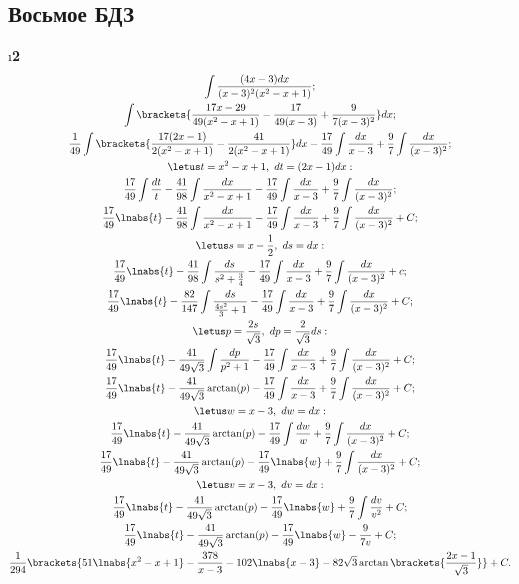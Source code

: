 \subsection{Восьмое БДЗ}

\setcounter{iii}{10}

\i \textbf{2}\\
\pu
\begin{gather*}
    \int\frac{(4x-3)dx}{(x-3)^2(x^2-x+1)};\\
    \int\brackets{\frac{17x-29}{49(x^2-x+1)}-\frac{17}{49(x-3)}+\frac{9}{7(x-3)^2}}dx;\\
    \frac{1}{49}\int\brackets{\frac{17(2x-1)}{2(x^2-x+1)}-\frac{41}{2(x^2-x+1)}}dx - \frac{17}{49}\int\frac{dx}{x-3} + \frac{9}{7}\int\frac{dx}{(x-3)^2};\\
    \letus t = x^2-x+1,\ dt = (2x-1)dx:\\
    \frac{17}{49}\int\frac{dt}{t} - \frac{41}{98}\int\frac{dx}{x^2-x+1} - \frac{17}{49}\int\frac{dx}{x-3} + \frac{9}{7}\int\frac{dx}{(x-3)^2};\\
    \frac{17}{49}\lnabs{t} - \frac{41}{98}\int\frac{dx}{x^2-x+1} - \frac{17}{49}\int\frac{dx}{x-3} + \frac{9}{7}\int\frac{dx}{(x-3)^2} + C;\\
    \letus s = x-\frac{1}{2},\ ds = dx:\\
    \frac{17}{49}\lnabs{t} - \frac{41}{98}\int\frac{ds}{s^2 + \frac{3}{4}} - \frac{17}{49}\int\frac{dx}{x-3} + \frac{9}{7}\int\frac{dx}{(x-3)^2} + c;\\
    \frac{17}{49}\lnabs{t} - \frac{82}{147}\int\frac{ds}{\frac{4s^2}{3}+1} - \frac{17}{49}\int\frac{dx}{x-3} + \frac{9}{7}\int\frac{dx}{(x-3)^2} + C;\\
    \letus p = \frac{2s}{\sqrt{3}},\ dp = \frac{2}{\sqrt{3}}ds:\\
    \frac{17}{49}\lnabs{t} - \frac{41}{49\sqrt{3}}\int\frac{dp}{p^2+1} - \frac{17}{49}\int\frac{dx}{x-3} + \frac{9}{7}\int\frac{dx}{(x-3)^2} + C;\\
    \frac{17}{49}\lnabs{t} - \frac{41}{49\sqrt{3}}\arctan(p) - \frac{17}{49}\int\frac{dx}{x-3} + \frac{9}{7}\int\frac{dx}{(x-3)^2} + C;\\
    \letus w = x-3,\ dw = dx:\\
    \frac{17}{49}\lnabs{t} - \frac{41}{49\sqrt{3}}\arctan(p) - \frac{17}{49}\int\frac{dw}{w} + \frac{9}{7}\int\frac{dx}{(x-3)^2} + C;\\
    \frac{17}{49}\lnabs{t} - \frac{41}{49\sqrt{3}}\arctan(p) - \frac{17}{49}\lnabs{w} + \frac{9}{7}\int\frac{dx}{(x-3)^2} + C;\\
    \letus v = x-3,\ dv = dx:\\
    \frac{17}{49}\lnabs{t} - \frac{41}{49\sqrt{3}}\arctan(p) - \frac{17}{49}\lnabs{w} + \frac{9}{7}\int\frac{dv}{v^2} + C;\\
    \frac{17}{49}\lnabs{t} - \frac{41}{49\sqrt{3}}\arctan(p) - \frac{17}{49}\lnabs{w} - \frac{9}{7v} + C;\\
    \frac{1}{294}\brackets{51\lnabs{x^2-x+1} - \frac{378}{x-3} - 102\lnabs{x-3} - 82\sqrt{3}\arctan\brackets{\frac{2x-1}{\sqrt{3}}}} + C.
\end{gather*}
